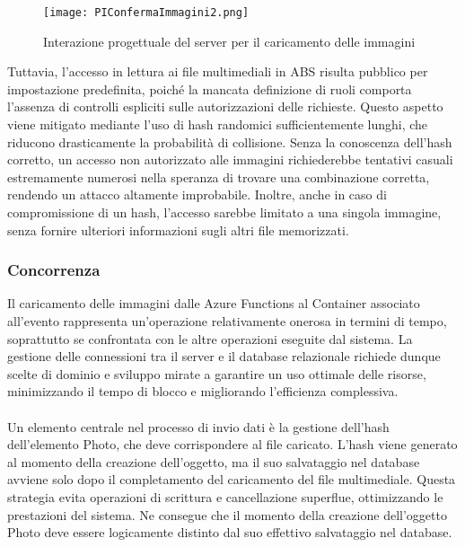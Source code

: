 \begin{figure}[h!]
    \centering
    \texttt{[image: PIConfermaImmagini2.png]}
    \caption{Interazione progettuale del server per il caricamento delle immagini }
\end{figure}

Tuttavia, l’accesso in lettura ai file multimediali in ABS risulta pubblico per impostazione predefinita, 
poiché la mancata definizione di ruoli comporta l’assenza di controlli espliciti sulle autorizzazioni delle richieste. 
Questo aspetto viene mitigato mediante l’uso di hash randomici sufficientemente lunghi, che riducono drasticamente la probabilità di collisione. 
Senza la conoscenza dell’hash corretto, un accesso non autorizzato alle immagini 
richiederebbe tentativi casuali estremamente numerosi nella speranza di trovare una combinazione corretta, rendendo un attacco altamente improbabile. 
Inoltre, anche in caso di compromissione di un hash, l’accesso sarebbe limitato a una singola immagine, senza fornire ulteriori informazioni sugli altri file memorizzati.

\clearpage

\subsubsection{ Concorrenza }

Il caricamento delle immagini dalle Azure Functions al Container associato all’evento rappresenta un'operazione relativamente onerosa in termini di tempo, 
soprattutto se confrontata con le altre operazioni eseguite dal sistema. 
La gestione delle connessioni tra il server e il database relazionale richiede dunque scelte di dominio e sviluppo mirate a garantire un uso ottimale delle risorse, 
minimizzando il tempo di blocco e migliorando l'efficienza complessiva.\\
\\
Un elemento centrale nel processo di invio dati è la gestione dell’hash dell’elemento Photo, che deve corrispondere al file caricato. 
L’hash viene generato al momento della creazione dell’oggetto, ma il suo salvataggio nel database avviene solo dopo il completamento del caricamento del file multimediale. 
Questa strategia evita operazioni di scrittura e cancellazione superflue, ottimizzando le prestazioni del sistema. 
Ne consegue che il momento della creazione dell’oggetto Photo deve essere logicamente distinto dal suo effettivo salvataggio nel database.

